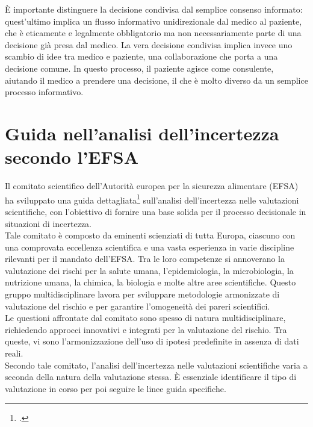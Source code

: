 È importante distinguere la decisione condivisa dal semplice consenso informato: quest'ultimo implica un flusso informativo unidirezionale dal medico al paziente, che è eticamente e legalmente obbligatorio ma non necessariamente parte di una decisione già presa dal medico. La vera decisione condivisa implica invece uno scambio di idee tra medico e paziente, una collaborazione che porta a una decisione comune. In questo processo, il paziente agisce come consulente, aiutando il medico a prendere una decisione, il che è molto diverso da un semplice processo informativo.


\section{Guida nell'analisi dell'incertezza secondo l'EFSA}
Il comitato scientifico dell'Autorità europea per la sicurezza alimentare (EFSA) ha sviluppato una guida dettagliata\footcite{womak:guida-analisi-incertezza} sull'analisi dell'incertezza nelle valutazioni scientifiche, con l'obiettivo di fornire una base solida per il processo decisionale in situazioni di incertezza.\\
Tale comitato è composto da eminenti scienziati di tutta Europa, ciascuno con una comprovata eccellenza scientifica e una vasta esperienza in varie discipline rilevanti per il mandato dell'EFSA. Tra le loro competenze si annoverano la valutazione dei rischi per la salute umana, l'epidemiologia, la microbiologia, la nutrizione umana, la chimica, la biologia e molte altre aree scientifiche. Questo gruppo multidisciplinare lavora per sviluppare metodologie armonizzate di valutazione del rischio e per garantire l'omogeneità dei pareri scientifici.\\
Le questioni affrontate dal comitato sono spesso di natura multidisciplinare, richiedendo approcci innovativi e integrati per la valutazione del rischio. Tra queste, vi sono l'armonizzazione dell'uso di ipotesi predefinite in assenza di dati reali.\\

Secondo tale comitato, l'analisi dell'incertezza nelle valutazioni scientifiche varia a seconda della natura della valutazione stessa. È essenziale identificare il tipo di valutazione in corso per poi seguire le linee guida specifiche.\\

